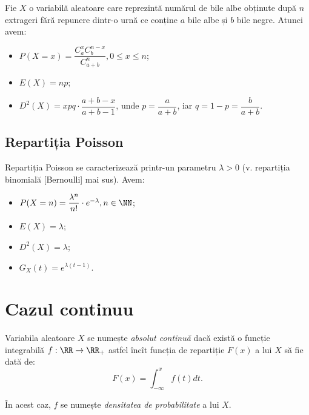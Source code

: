 \indent\indent Fie $ X $ o variabilă aleatoare care reprezintă numărul de bile albe
obținute după $ n $ extrageri fără repunere dintr-o urnă ce conține $ a $ bile albe
și $ b $ bile negre. Atunci avem:
\begin{itemize}
\item $ P(X = x) = \dfrac{C_a^x C_b^{n-x}}{C_{a + b}^n}, 0 \leq x \leq n $;
\item $ E(X) = np $;
\item $ D^2(X) = xpq \cdot \dfrac{a + b - x}{a + b - 1} $, unde $ p = \dfrac{a}{a+b}$,
  iar $ q = 1 - p = \dfrac{b}{a + b} $.
\end{itemize}


\subsection{Repartiția Poisson}

\indent\indent Repartiția Poisson se caracterizează printr-un parametru $ \lambda > 0 $
(v. repartiția binomială [Bernoulli] mai sus). Avem:
\begin{itemize}
\item $ P(X = n) = \dfrac{\lambda^n}{n!} \cdot e^{-\lambda}, n \in \NN $;
\item $ E(X) = \lambda $;
\item $ D^2(X) = \lambda $;
\item $ G_X(t) = e^{\lambda(t - 1)} $.
\end{itemize}


\section{Cazul continuu}


\begin{definition}\label{def:va-cont}
  Variabila aleatoare $ X $ se numește \emph{absolut continuă} dacă
  există o funcție integrabilă $ f : \RR \to \RR_+ $ astfel încît funcția
  de repartiție $ F(x) $ a lui $ X $ să fie dată de:
  \[
    F(x) = \int_{-\infty}^x f(t) dt.
  \]

  În acest caz, $ f $ se numește \emph{densitatea de probabilitate} a lui $ X $.
\end{definition}

